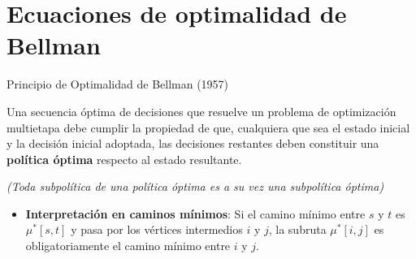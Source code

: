 \documentclass[
  ignorenonframetext,
]{beamer}
\providecommand{\tightlist}{%
  \setlength{\itemsep}{0pt}\setlength{\parskip}{0pt}}
\begin{document}
\section{Ecuaciones de optimalidad de
Bellman}\label{ecuaciones-de-optimalidad-de-bellman}

\begin{frame}{Principio de Optimalidad de Bellman (1957)}
\label{principio-de-optimalidad-de-bellman-1957}
\begin{tcolorbox}[enhanced jigsaw, colframe=quarto-callout-note-color-frame, toptitle=1mm, colback=white, colbacktitle=quarto-callout-note-color!10!white, titlerule=0mm, breakable, coltitle=black, opacityback=0, bottomrule=.15mm, title=\textcolor{quarto-callout-note-color}{\faInfo}\hspace{0.5em}{Principio de Optimalidad de Bellman}, rightrule=.15mm, arc=.35mm, leftrule=.75mm, left=2mm, toprule=.15mm, bottomtitle=1mm, opacitybacktitle=0.6]

Una secuencia óptima de decisiones que resuelve un problema de
optimización multietapa debe cumplir la propiedad de que, cualquiera que
sea el estado inicial y la decisión inicial adoptada, las decisiones
restantes deben constituir una \textbf{política óptima} respecto al
estado resultante.

\emph{(Toda subpolítica de una política óptima es a su vez una
subpolítica óptima)}

\end{tcolorbox}

\begin{itemize}
\tightlist
\item
  \textbf{Interpretación en caminos mínimos}: Si el camino mínimo entre
  \(s\) y \(t\) es \(\mu^*[s, t]\) y pasa por los vértices intermedios
  \(i\) y \(j\), la subruta \(\mu^*[i, j]\) es obligatoriamente el
  camino mínimo entre \(i\) y \(j\).
\end{itemize}
\end{frame}
\end{document}
